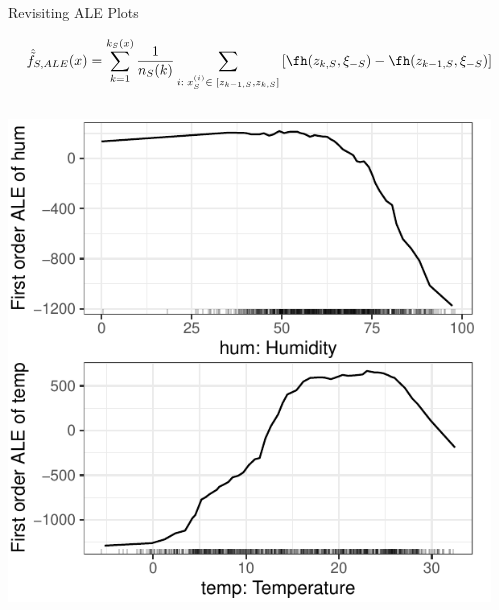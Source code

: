 \documentclass[11pt,compress,t,notes=noshow, aspectratio=169, xcolor=table]{beamer}
\begin{document}

    

\begin{frame}{Revisiting ALE Plots}

    \[
    \hat{\tilde{f}}_{S, ALE}(x) = \sum_{k = 1}^{k_S(x)}\frac{1}{n_S(k)}\sum_{i: \; x_S^{(i)} \in \; [z_{k-1, S}, z_{k, S}]}\left[\fh(z_{k, S}, \xi_{-S}) -\fh(z_{k-1, S}, \xi_{-S})\right]
    \]

    \begin{columns}[c, totalwidth=\linewidth]
    \begin{column}{0.5\textwidth}
        \includegraphics{figure/ale1d}
    \end{column}
    \begin{column}{0.5\textwidth}

\end{column}
\end{columns}
\end{frame}
\end{document}
